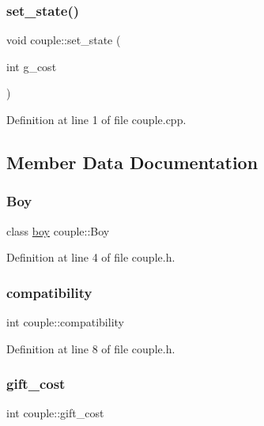 \subsubsection{\texorpdfstring{set\+\_\+state()}{set\_state()}}
{\footnotesize\ttfamily void couple\+::set\+\_\+state (\begin{DoxyParamCaption}\item[{int}]{g\+\_\+cost }\end{DoxyParamCaption})}



Definition at line 1 of file couple.\+cpp.



\subsection{Member Data Documentation}
\mbox{\label{classcouple_a2e7470aecd31a48d2ecac4e0043b5264}} 
\subsubsection{\texorpdfstring{Boy}{Boy}}
{\footnotesize\ttfamily class \hyperlink{classboy}{boy} couple\+::\+Boy}



Definition at line 4 of file couple.\+h.

\mbox{\label{classcouple_ac5a8c9e30fddfa733042af54cf87345f}} 
\subsubsection{\texorpdfstring{compatibility}{compatibility}}
{\footnotesize\ttfamily int couple\+::compatibility}



Definition at line 8 of file couple.\+h.

\mbox{\label{classcouple_a6a447b1d07e6b3c5a0edb7424f57d52c}} 
\subsubsection{\texorpdfstring{gift\+\_\+cost}{gift\_cost}}
{\footnotesize\ttfamily int couple\+::gift\+\_\+cost}



